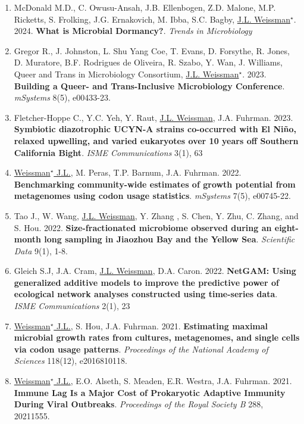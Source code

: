 \documentclass[]{res}
\begin{document}
\begin{resume}
\begin{enumerate}[leftmargin=*]
 \item McDonald M.D., C. Owusu-Ansah, J.B. Ellenbogen, Z.D. Malone, M.P. Ricketts, S. Frolking, J.G. Ernakovich, M. Ibba, S.C. Bagby, \underline{J.L. Weissman$^\star$}. 2024. {\bf What is Microbial Dormancy?}. \emph{Trends in Microbiology}

 \item Gregor R., J. Johnston, L. Shu Yang Coe, T. Evans, D. Forsythe, R. Jones, D. Muratore, B.F. Rodrigues de Oliveira, R. Szabo, Y. Wan, J. Williams, Queer and Trans in Microbiology Consortium, \underline{J.L. Weissman$^\star$}. 2023. {\bf Building a Queer- and Trans-Inclusive Microbiology Conference}. \emph{mSystems} 8(5), e00433-23.
 
\item Fletcher-Hoppe C., Y.C. Yeh, Y. Raut, \underline{J.L. Weissman}, J.A. Fuhrman. 2023. {\bf Symbiotic diazotrophic UCYN-A strains co-occurred with El Niño, relaxed upwelling, and varied eukaryotes over 10 years off Southern California Bight}. \emph{ISME Communications} 3(1), 63
 
  \item \underline{Weissman$^\star$ J.L.}, M. Peras, T.P. Barnum, J.A. Fuhrman. 2022. {\bf Benchmarking community-wide estimates of growth potential from metagenomes using codon usage statistics}. \emph{mSystems} 7(5), e00745-22.
  
    \item  Tao J., W. Wang, \underline{J.L. Weissman}, Y. Zhang , S. Chen, Y. Zhu, C. Zhang, and S. Hou. 2022. {\bf Size-fractionated microbiome observed during an eight-month long sampling in Jiaozhou Bay and the Yellow Sea}. \emph{Scientific Data} 9(1), 1-8.
 
 \item Gleich S.J, J.A. Cram, \underline{J.L. Weissman}, D.A. Caron. 2022. {\bf NetGAM: Using generalized additive models to improve the predictive power of ecological network analyses constructed using time-series data}. \emph{ISME Communications} 2(1), 23
 
\item \underline{Weissman$^\star$ J.L.}, S. Hou, J.A. Fuhrman. 2021. {\bf Estimating maximal microbial growth rates from cultures, metagenomes, and single cells via codon usage patterns}. \emph{Proceedings of the National Academy of Sciences} 118(12), e2016810118. 
 
\item \underline{Weissman$^\star$ J.L.}, E.O. Alseth, S. Meaden, E.R. Westra, J.A. Fuhrman. 2021. {\bf Immune Lag Is a Major Cost of Prokaryotic Adaptive Immunity During Viral Outbreaks}. \emph{Proceedings of the Royal Society B} 288, 20211555.


\end{enumerate}
\end{resume}
\end{document}
